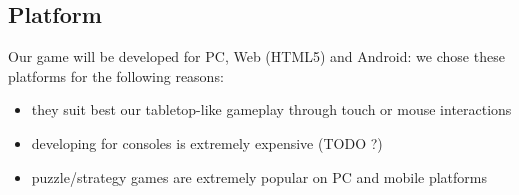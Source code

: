 \subsection{Platform}
Our game will be developed for PC, Web (HTML5) and Android: we chose these platforms for the following reasons:
\begin{itemize}
	\item they suit best our tabletop-like gameplay through touch or mouse interactions
	\item developing for consoles is extremely expensive (TODO ?)
	\item puzzle/strategy games are extremely popular on PC and mobile platforms
\end{itemize}

\clearpage